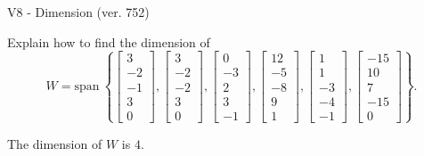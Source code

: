 \begin{exercise}
  \begin{exerciseTitle}V8 - Dimension (ver. 752)\end{exerciseTitle}
  \begin{exerciseStatement}
    Explain how to find the dimension of 
\[W=\mathrm{span}\ \left\{\left[\begin{array}{r}
3 \\
-2 \\
-1 \\
3 \\
0
\end{array}\right] , \left[\begin{array}{r}
3 \\
-2 \\
-2 \\
3 \\
0
\end{array}\right] , \left[\begin{array}{r}
0 \\
-3 \\
2 \\
3 \\
-1
\end{array}\right] , \left[\begin{array}{r}
12 \\
-5 \\
-8 \\
9 \\
1
\end{array}\right] , \left[\begin{array}{r}
1 \\
1 \\
-3 \\
-4 \\
-1
\end{array}\right] , \left[\begin{array}{r}
-15 \\
10 \\
7 \\
-15 \\
0
\end{array}\right]\right\}.\]



  \end{exerciseStatement}
  \begin{exerciseAnswer}
   The dimension of \(W\) is  \(4\).
  


  \end{exerciseAnswer}
\end{exercise}